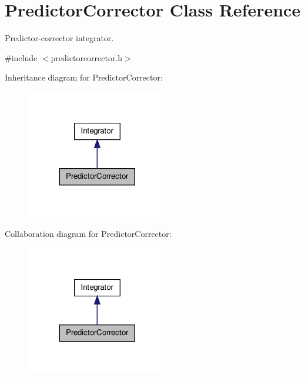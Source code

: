 \hypertarget{classPredictorCorrector}{\section{\-Predictor\-Corrector \-Class \-Reference}
\label{classPredictorCorrector}
}


\-Predictor-\/corrector integrator.  




{\ttfamily \#include $<$predictorcorrector.\-h$>$}



\-Inheritance diagram for \-Predictor\-Corrector\-:
\nopagebreak
\begin{figure}[H]
\begin{center}
\leavevmode
\includegraphics[width=176pt]{classPredictorCorrector__inherit__graph}
\end{center}
\end{figure}


\-Collaboration diagram for \-Predictor\-Corrector\-:
\nopagebreak
\begin{figure}[H]
\begin{center}
\leavevmode
\includegraphics[width=176pt]{classPredictorCorrector__coll__graph}
\end{center}
\end{figure}
